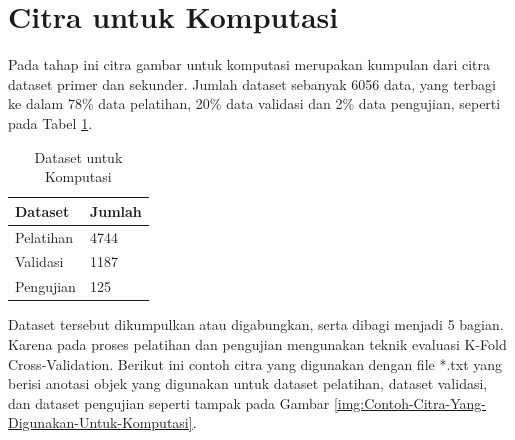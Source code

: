 \section{Citra untuk Komputasi}
\hspace{1,2cm}
Pada tahap ini citra gambar untuk komputasi merupakan kumpulan dari citra dataset primer dan sekunder. Jumlah dataset sebanyak 6056 data, yang terbagi ke dalam 78\% data pelatihan, 20\% data validasi dan 2\% data pengujian, seperti pada Tabel \ref{tbl:Dataset-Untuk-Komputasi}.

\begin{singlespace}
	\begin{table}[H]
		\centering
		\caption{Dataset untuk Komputasi}
		\label{tbl:Dataset-Untuk-Komputasi}
		\begin{tabular}{|m{5cm}|m{5cm}|}
			\hline
			\rowcolor[HTML]{D9D9D9} 
			Dataset   & Jumlah \\ \hline
			Pelatihan & 4744   \\ \hline
			Validasi  & 1187   \\ \hline
			Pengujian & 125    \\ \hline
		\end{tabular}
	\end{table}
\end{singlespace}

Dataset tersebut dikumpulkan atau digabungkan, serta dibagi menjadi 5 bagian. Karena pada proses pelatihan dan pengujian mengunakan teknik evaluasi K-Fold Cross-Validation. Berikut ini contoh citra yang digunakan dengan file *.txt yang berisi anotasi objek yang digunakan untuk dataset pelatihan, dataset validasi, dan dataset pengujian seperti tampak pada Gambar \ref{img:Contoh-Citra-Yang-Digunakan-Untuk-Komputasi}.


